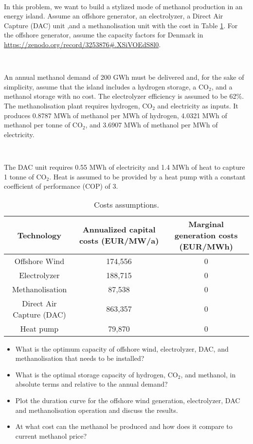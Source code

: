 \documentclass[10pt]{article}
\newenvironment{problem}[2][Problem]{\begin{trivlist}
\item[\hskip \labelsep {\bfseries #1}\hskip \labelsep {\bfseries #2.}]}{\end{trivlist}}
\begin{document}
\

\begin{problem}{12.2}

In this problem, we want to build a stylized mode of methanol production in an energy island. Assume an offshore generator, an electrolyzer, a Direct Air Capture (DAC) unit ,and a methanolisation unit with the cost in Table \ref{tab_cost}. For the offshore generator, assume the capacity factors for Denmark in \url{https://zenodo.org/record/3253876#.XSiVOEdS8l0}.

\

An annual methanol demand of 200 GWh must be delivered and, for the sake of simplicity, assume that the island includes a hydrogen storage, a CO$_2$, and a methanol storage with no cost. The electrolyzer efficiency is assumed to be 62\%. The methanolisation plant requires hydrogen, CO$_2$ and electricity as inputs. It produces 0.8787 MWh of methanol per MWh of hydrogen, 4.0321 MWh of methanol per tonne of CO$_2$, and 3.6907 MWh of methanol per MWh of electricity. 

\

The DAC unit requires  0.55 MWh of electricity and 1.4 MWh of heat to capture 1 tonne of CO$_2$. Heat is assumed to be provided by a heat pump with a constant coefficient of performance (COP) of 3.



\begin{table}[h]
    \centering
    \begin{tabular}{ccc}
    \hline
        Technology & Annualized capital costs (EUR/MW/a) & Marginal generation costs (EUR/MWh) \\
    \hline
    Offshore Wind &  174,556 & 0 \\
    Electrolyzer & 188,715 & 0 \\
    Methanolisation & 87,538 & 0 \\
    Direct Air Capture (DAC) & 863,357 & 0 \\
    Heat pump & 79,870 & 0 \\
    \hline
    \end{tabular}
    \caption{Costs assumptions.}
    \label{tab_cost}
\end{table}

\begin{itemize}
\item[a)] What is the optimum capacity of offshore wind, electrolyzer, DAC, and methanolisation that needs to be installed?
\item[b)] What is the optimal storage capacity of hydrogen, CO$_2$, and methanol, in absolute terms and relative to the annual demand?
\item[c)] Plot the duration curve for the offshore wind generation, electrolyzer, DAC and methanolisation operation and discuss the results.
\item[d)] At what cost can the methanol be produced and how does it compare to current methanol price?

\end{itemize}


\end{problem}



\end{document}
